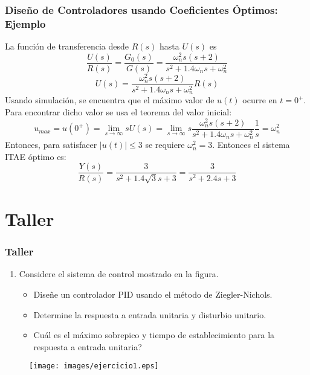 \documentclass[aspectratio=169,handout]{beamer}
\theoremstyle{definition}
\theoremstyle{plain}
\theoremstyle{remark}
\newcounter{saveenumi}
\newcommand{\seti}{\setcounter{saveenumi}{\value{enumi}}}
\begin{document}
\begin{frame}[<+->]\frametitle{Diseño de Controladores usando Coeficientes Óptimos: Ejemplo}
La función de transferencia desde $R(s)$ hasta $U(s)$ es
\begin{equation*}
	\frac{U(s)}{R(s)} = \frac{G_0(s)}{G(s)} = \frac{\omega_n^2 s (s+2)}{s^2 + 1.4 \omega_n s + \omega_n^2}
\end{equation*}
\begin{equation*}
	U(s) = \frac{\omega_n^2 s (s+2)}{s^2 + 1.4 \omega_n s + \omega_n^2} R(s)
\end{equation*}
Usando simulación, se encuentra que el máximo valor de $u(t)$ ocurre en $t = 0^+$. Para encontrar dicho valor se usa el teorema del valor inicial:
\begin{equation*}
	u_{max} = u(0^+) = \lim_{s \rightarrow \infty} s U(s) = \lim_{s \rightarrow \infty} s \frac{\omega_n^2 s (s+2)}{s^2 + 1.4 \omega_n s + \omega_n^2} \frac{1}{s} = \omega_n^2
\end{equation*}
Entonces, para satisfacer $|u(t)| \leq 3$ se requiere $\omega_n^2 = 3$. Entonces el sistema ITAE óptimo es:
\begin{equation*}
	\frac{Y(s)}{R(s)} = \frac{3}{s^2 + 1.4 \sqrt{3} s + 3} = \frac{3}{s^2 + 2.4 s + 3} 
\end{equation*}
\end{frame}

\section{Taller}
\begin{frame}[c]\frametitle{Taller}
	\begin{enumerate}
		\item Considere el sistema de control mostrado en la figura.
		\begin{itemize}
			\item Diseñe un controlador PID usando el método de Ziegler-Nichols.
			\item Determine la respuesta a entrada unitaria y disturbio unitario.
			\item Cuál es el máximo sobrepico y tiempo de establecimiento para la respuesta a entrada unitaria?
		\end{itemize}
		\seti
	\end{enumerate}
	\begin{figure}
		\texttt{[image: images/ejercicio1.eps]}
	\end{figure}
\end{frame}
 
\end{document}
